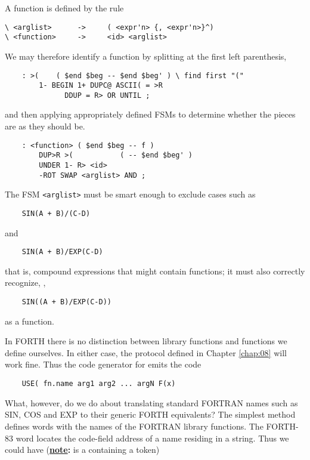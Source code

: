 A function is defined by the rule

\begin{verbatim}
\ <arglist>      ->     ( <expr'n> {, <expr'n>}^)
\ <function>     ->     <id> <arglist>
\end{verbatim}

We may therefore identify a function by splitting at the first left parenthesis,

\begin{lstlisting}
    : >(    ( $end $beg -- $end $beg' ) \ find first "("
        1- BEGIN 1+ DUPC@ ASCII( = >R
              DDUP = R> OR UNTIL ;
\end{lstlisting}

and then applying appropriately defined FSMs to determine whether the pieces are as they should be.

\begin{lstlisting}
    : <function> ( $end $beg -- f )
        DUP>R >(           ( -- $end $beg' )
        UNDER 1- R> <id>
        -ROT SWAP <arglist> AND ;
\end{lstlisting}

The FSM \texttt{<arglist>} must be smart enough to exclude cases such as

\begin{lstlisting}
    SIN(A + B)/(C-D)
\end{lstlisting}

and

\begin{lstlisting}
    SIN(A + B)/EXP(C-D)
\end{lstlisting}

that is, compound expressions that might contain functions; it must also correctly recognize, \eg,

\begin{lstlisting}
    SIN((A + B)/EXP(C-D))
\end{lstlisting}

as a function.

In FORTH there is no distinction between library functions and functions we define ourselves. In either case, the protocol defined in Chapter \ref{chap:08} will work fine. Thus the code generator for  emits the code

\begin{lstlisting}
    USE( fn.name arg1 arg2 ... argN F(x)
\end{lstlisting}

What, however, do we do about translating standard FORTRAN names such as SIN, COS and EXP to their generic FORTH equivalents? The simplest method defines words with the names of the FORTRAN library functions. The FORTH-83 word  locates the code-field address of a name residing in a string. Thus we could have (\textbf{\underline{note}:}  is a  containing a token)

